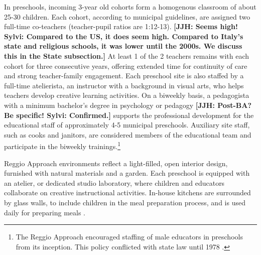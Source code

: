 In preschools, incoming 3-year old cohorts form a homogenous classroom of about 25-30 children. Each cohort, according to municipal guidelines, are assigned two full-time co-teachers (teacher-pupil ratios are 1:12-13). \textbf{[JJH: Seems high! Sylvi: Compared to the US, it does seem high. Compared to Italy's state and religious schools, it was lower until the 2000s. We discuss this in the State subsection.]} At least 1 of the 2 teachers remains with each cohort for three consecutive years, offering extended time for continuity of care and strong teacher-family engagement. Each preschool site is also staffed by a full-time atelierista, an instructor with a background in visual arts, who helps teachers develop creative learning activities. On a biweekly basis, a pedagogista with a minimum bachelor's degree in psychology or pedagogy \textbf{[JJH: Post-BA? Be specific! Sylvi: Confirmed.]} supports the professional development for the educational staff of approximately 4-5 municipal preschools. Auxiliary site staff, such as cooks and janitors, are considered members of the educational team and participate in the biweekly trainings.\footnote{The Reggio Approach encouraged staffing of male educators in preschools from its inception. This policy conflicted with state law until 1978 \citep{Hohnerlein_2015_Development-and-Diffusion}.}

Reggio Approach environments reflect a light-filled, open interior design, furnished with natural materials and a garden. Each preschool is equipped with an atelier, or dedicated studio laboratory, where children and educators collaborate on creative instructional activities. In-house kitchens are surrounded by glass walls, to include children in the meal preparation process, and is used daily for preparing meals \citep{Rinaldi_2006_ReggioEmilia_BOOK,Vecchi_2010_ReggioEmilia_BOOK}. 

